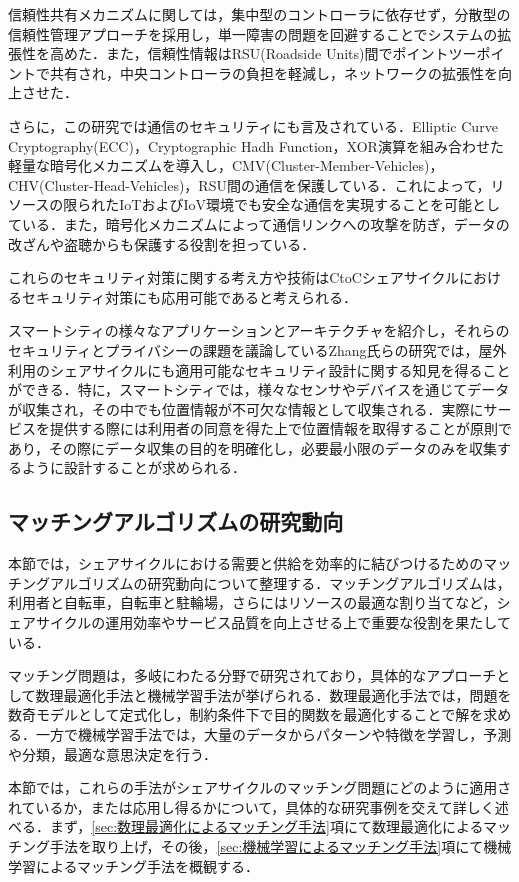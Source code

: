           \par 信頼性共有メカニズムに関しては，集中型のコントローラに依存せず，分散型の信頼性管理アプローチを採用し，単一障害の問題を回避することでシステムの拡張性を高めた．また，信頼性情報はRSU(Roadside Units)間でポイントツーポイントで共有され，中央コントローラの負担を軽減し，ネットワークの拡張性を向上させた．
          \par さらに，この研究では通信のセキュリティにも言及されている．Elliptic Curve Cryptography(ECC)，Cryptographic Hadh Function，XOR演算を組み合わせた軽量な暗号化メカニズムを導入し，CMV(Cluster-Member-Vehicles)，CHV(Cluster-Head-Vehicles)，RSU間の通信を保護している．これによって，リソースの限られたIoTおよびIoV環境でも安全な通信を実現することを可能としている．また，暗号化メカニズムによって通信リンクへの攻撃を防ぎ，データの改ざんや盗聴からも保護する役割を担っている．
          \par これらのセキュリティ対策に関する考え方や技術はCtoCシェアサイクルにおけるセキュリティ対策にも応用可能であると考えられる．
          \par スマートシティの様々なアプリケーションとアーキテクチャを紹介し，それらのセキュリティとプライバシーの課題を議論しているZhang氏らの研究では，屋外利用のシェアサイクルにも適用可能なセキュリティ設計に関する知見を得ることができる．特に，スマートシティでは，様々なセンサやデバイスを通じてデータが収集され，その中でも位置情報が不可欠な情報として収集される．実際にサービスを提供する際には利用者の同意を得た上で位置情報を取得することが原則であり，その際にデータ収集の目的を明確化し，必要最小限のデータのみを収集するように設計することが求められる．
          
  
  \subsection{マッチングアルゴリズムの研究動向}
    \label{sec:マッチングアルゴリズムの研究動向}
      \par 本節では，シェアサイクルにおける需要と供給を効率的に結びつけるためのマッチングアルゴリズムの研究動向について整理する．マッチングアルゴリズムは，利用者と自転車，自転車と駐輪場，さらにはリソースの最適な割り当てなど，シェアサイクルの運用効率やサービス品質を向上させる上で重要な役割を果たしている．
      \par マッチング問題は，多岐にわたる分野で研究されており，具体的なアプローチとして数理最適化手法と機械学習手法が挙げられる．数理最適化手法では，問題を数奇モデルとして定式化し，制約条件下で目的関数を最適化することで解を求める．一方で機械学習手法では，大量のデータからパターンや特徴を学習し，予測や分類，最適な意思決定を行う．
      \par 本節では，これらの手法がシェアサイクルのマッチング問題にどのように適用されているか，または応用し得るかについて，具体的な研究事例を交えて詳しく述べる．まず，\ref{sec:数理最適化によるマッチング手法}項にて数理最適化によるマッチング手法を取り上げ，その後，\ref{sec:機械学習によるマッチング手法}項にて機械学習によるマッチング手法を概観する．

